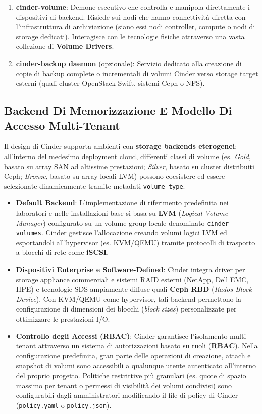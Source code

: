 \documentclass[11pt, a4paper]{article}
\begin{document}
\begin{enumerate}
    \item \textbf{cinder-volume}: Demone esecutivo che controlla e manipola direttamente i dispositivi di backend. Risiede sui nodi che hanno connettività diretta con l'infrastruttura di archiviazione (siano essi nodi controller, compute o nodi di storage dedicati). Interagisce con le tecnologie fisiche attraverso una vasta collezione di \textbf{Volume Drivers}.
    \item \textbf{cinder-backup daemon} (opzionale): Servizio dedicato alla creazione di copie di backup complete o incrementali di volumi Cinder verso storage target esterni (quali cluster OpenStack Swift, sistemi Ceph o NFS).
\end{enumerate}

\subsection{Backend Di Memorizzazione E Modello Di Accesso Multi-Tenant}

Il design di Cinder supporta ambienti con \textbf{storage backends eterogenei}: all'interno del medesimo deployment cloud, differenti classi di volume (es. \emph{Gold}, basato su array SAN ad altissime prestazioni; \emph{Silver}, basato su cluster distribuiti Ceph; \emph{Bronze}, basato su array locali LVM) possono coesistere ed essere selezionate dinamicamente tramite metadati \texttt{volume-type}.

\begin{itemize}
    \item \textbf{Default Backend}: L'implementazione di riferimento predefinita nei laboratori e nelle installazioni base si basa su \textbf{LVM} (\emph{Logical Volume Manager}) configurato su un volume group locale denominato \texttt{cinder-volumes}. Cinder gestisce l'allocazione creando volumi logici LVM ed esportandoli all'hypervisor (es. KVM/QEMU) tramite protocolli di trasporto a blocchi di rete come \textbf{iSCSI}.
    \item \textbf{Dispositivi Enterprise e Software-Defined}: Cinder integra driver per storage appliance commerciali e sistemi RAID esterni (NetApp, Dell EMC, HPE) e tecnologie SDS ampiamente diffuse quali \textbf{Ceph RBD} (\emph{Rados Block Device}). Con KVM/QEMU come hypervisor, tali backend permettono la configurazione di dimensioni dei blocchi (\emph{block sizes}) personalizzate per ottimizzare le prestazioni I/O.
    \item \textbf{Controllo degli Accessi (RBAC)}: Cinder garantisce l'isolamento multi-tenant attraverso un sistema di autorizzazioni basato su ruoli (\textbf{RBAC}). Nella configurazione predefinita, gran parte delle operazioni di creazione, attach e snapshot di volumi sono accessibili a qualunque utente autenticato all'interno del proprio progetto. Politiche restrittive più granulari (es. quote di spazio massimo per tenant o permessi di visibilità dei volumi condivisi) sono configurabili dagli amministratori modificando il file di policy di Cinder (\texttt{policy.yaml} o \texttt{policy.json}).
\end{itemize}
\end{document}
